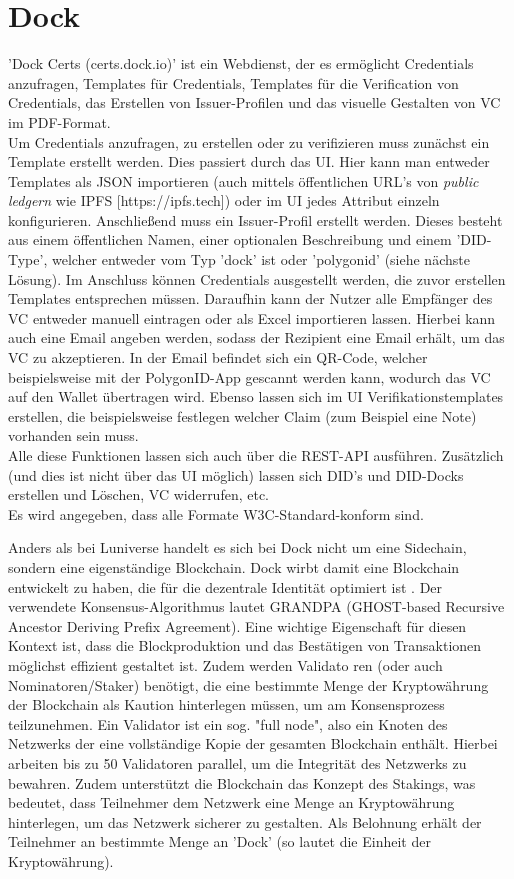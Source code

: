 \section{Dock}
'Dock Certs (certs.dock.io)' ist ein Webdienst, der es ermöglicht Credentials anzufragen, Templates für Credentials, Templates für die Verification von Credentials, das Erstellen von Issuer-Profilen und das visuelle Gestalten von VC im PDF-Format.\\
Um Credentials anzufragen, zu erstellen oder zu verifizieren muss zunächst ein Template erstellt werden. Dies passiert durch das UI. Hier kann man entweder Templates als JSON importieren (auch mittels öffentlichen URL's von \textsl{public ledgern} wie IPFS [https://ipfs.tech]) oder im UI jedes Attribut einzeln konfigurieren. Anschließend muss ein Issuer-Profil erstellt werden. Dieses besteht aus einem öffentlichen Namen, einer optionalen Beschreibung und einem 'DID-Type', welcher entweder vom Typ 'dock' ist oder 'polygonid' (siehe nächste Lösung).
Im Anschluss können Credentials ausgestellt werden, die zuvor erstellen Templates entsprechen müssen. Daraufhin kann der Nutzer alle Empfänger des VC entweder manuell eintragen oder als Excel importieren lassen. Hierbei kann auch eine Email angeben werden, sodass der Rezipient eine Email erhält, um das VC zu akzeptieren. In der Email befindet sich ein QR-Code, welcher beispielsweise mit der PolygonID-App gescannt werden kann, wodurch das VC auf den Wallet übertragen wird.
Ebenso lassen sich im UI Verifikationstemplates erstellen, die beispielsweise festlegen welcher Claim (zum Beispiel eine Note) vorhanden sein muss.\\
Alle diese Funktionen lassen sich auch über die REST-API ausführen. Zusätzlich (und dies ist nicht über das UI möglich) lassen sich DID's und DID-Docks erstellen und Löschen, VC widerrufen, etc. \\
Es wird angegeben, dass alle Formate W3C-Standard-konform sind.

Anders als bei Luniverse handelt es sich bei Dock nicht um eine Sidechain, sondern eine eigenständige Blockchain. Dock wirbt damit eine Blockchain entwickelt zu haben, die für die dezentrale Identität optimiert ist \cite{ID30}. Der verwendete Konsensus-Algorithmus lautet GRANDPA (GHOST-based Recursive Ancestor Deriving Prefix Agreement). Eine wichtige Eigenschaft für diesen Kontext ist, dass die Blockproduktion und das Bestätigen von Transaktionen möglichst effizient gestaltet ist. Zudem werden Validato ren (oder auch Nominatoren/Staker) benötigt, die eine bestimmte Menge der Kryptowährung der Blockchain als Kaution hinterlegen müssen, um am Konsensprozess teilzunehmen. Ein Validator ist ein sog. "full node", also ein Knoten des Netzwerks der eine vollständige Kopie der gesamten Blockchain enthält. Hierbei arbeiten bis zu 50 Validatoren parallel, um die Integrität des Netzwerks zu bewahren. Zudem unterstützt die Blockchain das Konzept des Stakings, was bedeutet, dass Teilnehmer dem Netzwerk eine Menge an Kryptowährung hinterlegen, um das Netzwerk sicherer zu gestalten. Als Belohnung erhält der Teilnehmer an bestimmte Menge an 'Dock' (so lautet die Einheit der Kryptowährung).



